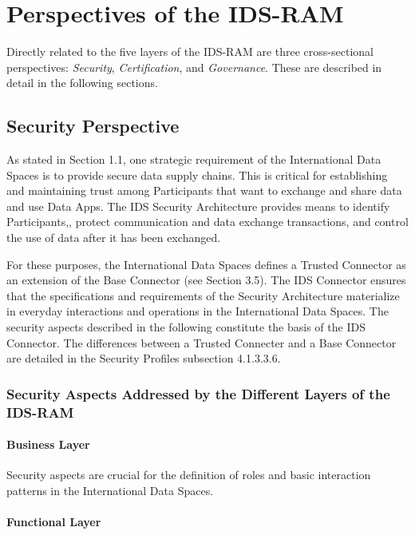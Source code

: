 
\section{Perspectives of the IDS-RAM}
Directly related to the five layers of the IDS-RAM are three cross-sectional perspectives: \textit{Security}, \textit{Certification}, and \textit{Governance}. These are described in detail in the following sections.

\subsection{Security Perspective}
As stated in Section 1.1, one strategic requirement of the International Data Spaces is to provide secure data supply chains. This is critical for establishing and maintaining trust among Participants that want to exchange and share data and use Data Apps. The IDS Security Architecture provides means to identify Participants,, protect communication and data exchange transactions, and control the use of data after it has been exchanged.

For these purposes, the International Data Spaces defines a Trusted Connector as an extension of the Base Connector (see Section 3.5). The IDS Connector ensures that the specifications and requirements of the Security Architecture materialize in everyday interactions and operations in the International Data Spaces. The security aspects described in the following constitute the basis of the IDS Connector. The differences between a Trusted Connecter and a Base Connector are detailed in the Security Profiles subsection 4.1.3.3.6.

\subsubsection{Security Aspects Addressed by the Different Layers of the IDS-RAM}

\paragraph*{Business Layer\\}

Security aspects are crucial for the definition of roles and basic interaction patterns in the International Data Spaces.

\paragraph*{Functional Layer\\}

